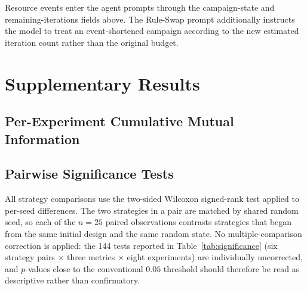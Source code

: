 Resource events enter the agent prompts through the campaign-state and remaining-iterations fields above. The Rule-Swap prompt additionally instructs the model to treat an event-shortened campaign according to the new estimated iteration count rather than the original budget.


\section{Supplementary Results}
\label{app:supplementary_results}

\subsection{Per-Experiment Cumulative Mutual Information}
\label{app:cumulative_mi_table}

\begin{table}[H]
\centering
\small

\caption{Cumulative mutual information, final normalized hypervolume, and area
         under the hypervolume curve for every system, experiment, and strategy
         (mean $\pm$ SEM, $n = 25$ seeds).}
\label{tab:cumulative-mi-full}
\end{table}

\subsection{Pairwise Significance Tests}
\label{app:significance}

All strategy comparisons use the two-sided Wilcoxon signed-rank test applied to
per-seed differences. The two strategies in a pair are matched by shared random seed,
so each of the $n = 25$ paired observations contrasts strategies that began from the
same initial design and the same random state. No multiple-comparison correction is
applied: the 144 tests reported in Table~\ref{tab:significance} (six strategy pairs
$\times$ three metrics $\times$ eight experiments) are individually uncorrected, and
$p$-values close to the conventional $0.05$ threshold should therefore be read as
descriptive rather than confirmatory.

\begin{table}[H]
\centering
\footnotesize

\caption{Pairwise strategy comparisons for final normalized hypervolume, AUC-HV,
         and cumulative mutual information ($n = 25$ seeds per strategy). Two-sided
         paired Wilcoxon signed-rank, uncorrected; markers denote
         \textsuperscript{*}$p < 0.05$, \textsuperscript{**}$p < 0.01$,
         \textsuperscript{***}$p < 0.001$.}
\label{tab:significance}
\end{table}
